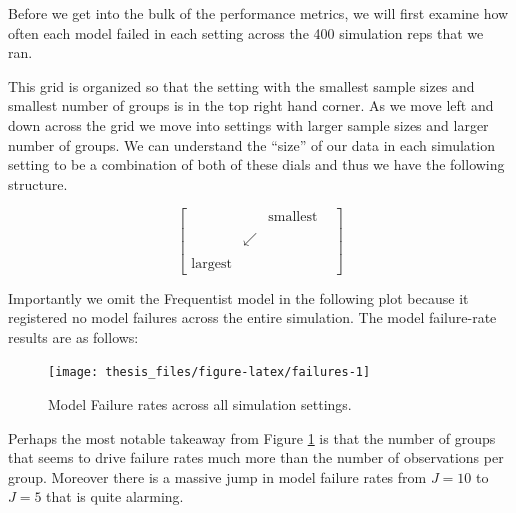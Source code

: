 \documentclass[12pt,twoside]{reedthesis}
\begin{document}
Before we get into the bulk of the performance metrics, we will first examine how often each model failed in each setting across the 400 simulation reps that we ran.

This grid is organized so that the setting with the smallest sample sizes and smallest number of groups is in the top right hand corner. As we move left and down across the grid we move into settings with larger sample sizes and larger number of groups. We can understand the ``size'' of our data in each simulation setting to be a combination of both of these dials and thus we have the following structure.

\[
\begin{bmatrix}
 &  & \text{smallest} \\
 & & & \\
 & \swarrow &  \\
 & & & \\
\text{largest} & & 
\end{bmatrix}
\]

Importantly we omit the Frequentist model in the following plot because it registered no model failures across the entire simulation. The model failure-rate results are as follows:
\begin{figure}

{\centering \texttt{[image: thesis\_files/figure-latex/failures-1]} 

}

\caption{Model Failure rates across all simulation settings.}\label{fig:failures}
\end{figure}
Perhaps the most notable takeaway from Figure \ref{fig:failures} is that the number of groups that seems to drive failure rates much more than the number of observations per group. Moreover there is a massive jump in model failure rates from \(J = 10\) to \(J = 5\) that is quite alarming.
\end{document}
